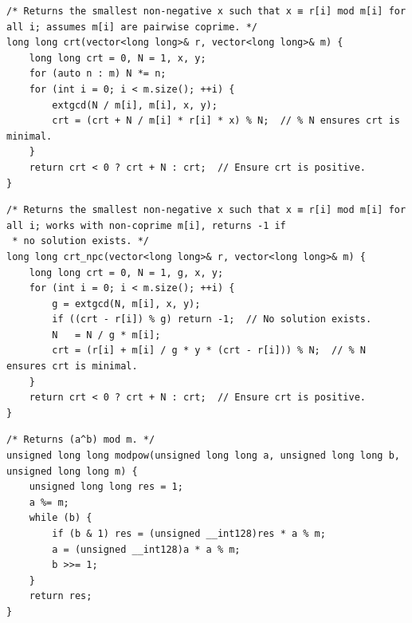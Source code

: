 \documentclass[a4paper,10pt]{article}
\newenvironment{keepfunction}{\begin{samepage}}{\end{samepage}}
\begin{document}
\begin{keepfunction}
\begin{verbatim}
/* Returns the smallest non-negative x such that x ≡ r[i] mod m[i] for all i; assumes m[i] are pairwise coprime. */
long long crt(vector<long long>& r, vector<long long>& m) {
    long long crt = 0, N = 1, x, y;
    for (auto n : m) N *= n;
    for (int i = 0; i < m.size(); ++i) {
        extgcd(N / m[i], m[i], x, y);
        crt = (crt + N / m[i] * r[i] * x) % N;  // % N ensures crt is minimal.
    }
    return crt < 0 ? crt + N : crt;  // Ensure crt is positive.
}
\end{verbatim}
\end{keepfunction}

\begin{keepfunction}
\begin{verbatim}
/* Returns the smallest non-negative x such that x ≡ r[i] mod m[i] for all i; works with non-coprime m[i], returns -1 if
 * no solution exists. */
long long crt_npc(vector<long long>& r, vector<long long>& m) {
    long long crt = 0, N = 1, g, x, y;
    for (int i = 0; i < m.size(); ++i) {
        g = extgcd(N, m[i], x, y);
        if ((crt - r[i]) % g) return -1;  // No solution exists.
        N   = N / g * m[i];
        crt = (r[i] + m[i] / g * y * (crt - r[i])) % N;  // % N ensures crt is minimal.
    }
    return crt < 0 ? crt + N : crt;  // Ensure crt is positive.
}
\end{verbatim}
\end{keepfunction}

\begin{keepfunction}
\begin{verbatim}
/* Returns (a^b) mod m. */
unsigned long long modpow(unsigned long long a, unsigned long long b, unsigned long long m) {
    unsigned long long res = 1;
    a %= m;
    while (b) {
        if (b & 1) res = (unsigned __int128)res * a % m;
        a = (unsigned __int128)a * a % m;
        b >>= 1;
    }
    return res;
}
\end{verbatim}
\end{keepfunction}
\end{document}
